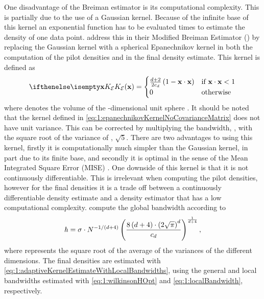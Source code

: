 	One disadvantage of the Breiman estimator is its computational complexity. This is partially due to the use of a Gaussian kernel. Because of the infinite base of this kernel an exponential function has to be evaluated \varNumPatterns times to estimate the density of one data point. 
	\textcite{wilkinson1995dataplot} address this in their Modified Breiman Estimator (\mbe) by replacing the Gaussian kernel with a spherical Epanechnikov kernel in both the computation of the pilot densities and in the final density estimate. This kernel is defined as
	\begin{equation}\label{eq:1:epanechnikovKernelNoCovarianceMatrix}
		\varKernel[\varEpan]{\varPattern} = 
		\begin{cases}
			\frac{\varDim + 2}{2\varUnitSphere{\varDim}} \left( 1 - \varPattern \cdot \varPattern \right) & \text{if } \varPattern \cdot \varPattern < 1\\
			0 & \text{otherwise}
		\end{cases}
	\end{equation}
	 where \varUnitSphere{\varDim} denotes the volume of the \varDim-dimensional unit sphere \cite{epanechnikov1969non}. It should be noted that the kernel defined in \cref{eq:1:epanechnikovKernelNoCovarianceMatrix} does not have unit variance. This can be corrected by multiplying the bandwidth, \varBandwidth,  with the square root of the variance of \varKernel[\varEpan]{}, \ie $\sqrt{5}$. There are two advantages to using this kernel, firstly it is computationally much simpler than the Gaussian kernel, in part due to its finite base, and secondly it is optimal in the sense of the Mean Integrated Square Error (MISE) \cite{epanechnikov1969non}. One downside of this kernel is that it is not continuously differentiable. This is irrelevant when computing the pilot densities, however for the final densities it is a trade off between a continuously differentiable density estimate and a density estimator that has a low computational complexity.
	\textcite{wilkinson1995dataplot} compute the global bandwidth according to
		\begin{equation}\label{eq:1:wilkinsonHOpt}
			\mathit{h} = 
			\sigma \cdot N^{{-1}/{\left(d +  4\right)}}
			\left(\frac{8\left(d + 4\right) \cdot \left(2 \sqrt{\pi}\right)^d}{c_{d}}\right)^{\frac{1}{d + 4}},
		\end{equation}
	where \varWilkinsonConstant represents the square root of the average of the variances of the different dimensions. The final densities are estimated with \cref{eq:1:adaptiveKernelEstimateWithLocalBandwidths}, using the general and local bandwidths estimated with \cref{eq:1:wilkinsonHOpt} and \eqref{eq:1:localBandwidth}, respectively. 

